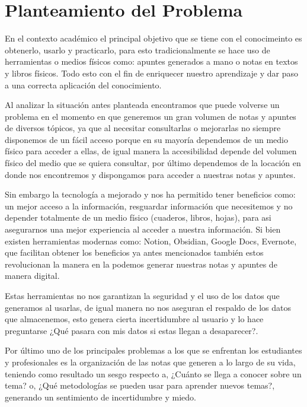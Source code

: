 \chapter{Planteamiento del Problema}
\thispagestyle{fancy}
\noindent En el contexto académico el principal objetivo que se tiene con el conocimeinto es obtenerlo, usarlo y practicarlo, para esto tradicionalmente se hace uso de herramientas o medios físicos como: apuntes generados a mano o notas en textos y libros físicos. Todo esto con el fin de enriquecer nuestro aprendizaje y dar paso a una correcta aplicación del conocimiento.

\vspace{.5cm}

Al analizar la situación antes planteada encontramos que puede volverse un problema en el momento en que generemos un gran volumen de notas y apuntes de diversos tópicos, ya que al necesitar consultarlas o mejorarlas no siempre disponemos de un fácil acceso porque en su mayoría dependemos de un medio físico para acceder a ellas, de igual manera la accesibilidad depende del volumen físico del medio que se quiera consultar, por último dependemos de la locación en donde nos encontremos y dispongamos para acceder a nuestras notas y apuntes.

\vspace{.5cm}

Sin embargo la tecnología a mejorado y nos ha permitido tener beneficios como: un mejor acceso a la información, resguardar información que necesitemos y no depender totalmente de un medio físico (cuaderos, libros, hojas), para asi asegurarnos una mejor experiencia al acceder a nuestra información. Si bien existen herramientas modernas como: Notion, Obsidian, Google Docs, Evernote, que facilitan obtener los beneficios ya antes mencionados también estos revolucionan la manera en la podemos generar nuestras notas y apuntes de manera digital.

\vspace{.5cm}

Estas herramientas no nos garantizan la seguridad y el uso de los datos que generamos al usarlas, de igual manera no nos aseguran el respaldo de los datos que almacenemos, esto genera cierta incertidumbre al usuario y lo hace preguntarse ¿Qué pasara con mis datos si estas llegan a desaparecer?.

\vspace{.5cm}

Por último uno de los principales problemas a los que se enfrentan los estudiantes y profesionales es la organización de las notas que generen a lo largo de su vida, teniendo como resultado un sesgo respecto a, ¿Cuánto se llega a conocer sobre un tema? o, ¿Qué  metodologías se pueden usar para aprender nuevos temas?, generando un sentimiento de incertidumbre y miedo.

